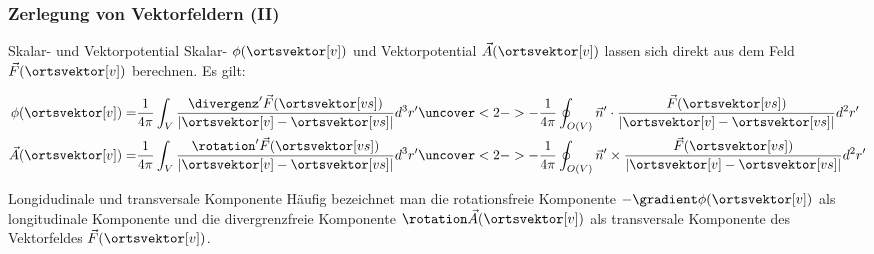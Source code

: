 \begin{frame}
  \frametitle{Zerlegung von Vektorfeldern (II)}
  \begin{block}{Skalar- und Vektorpotential}
    \alert{Skalar-} $\phi (\ortsvektor[v])$ und \alert{Vektorpotential}
    $\vec{A}(\ortsvektor[v])$ lassen sich direkt aus dem Feld
    $\vec{F}(\ortsvektor[v])$ berechnen. Es gilt:

    \begin{align*}
  \phi (\ortsvektor[v]) = & \frac{1}{4\pi} \int_V \frac{\divergenz'
                     \vec{F}(\ortsvektor[vs])}{\left|\ortsvektor[v]-\ortsvektor[vs]\right|}
                     d^3r'  \uncover<2->{- \frac{1}{4\pi} \oint_{O(V)}
                     \vec{n}' \cdot \frac{\vec{F}(\ortsvektor[vs])}{\left|\ortsvektor[v]-\ortsvektor[vs]\right|}
                     d^2r'}\\
  \vec{A} (\ortsvektor[v]) = & \frac{1}{4\pi} \int_V \frac{\rotation'
                     \vec{F}(\ortsvektor[vs])}{\left|\ortsvektor[v]-\ortsvektor[vs]\right|}
                     d^3r'  \uncover<2->{- \frac{1}{4\pi} \oint_{O(V)}
                     \vec{n}' \times \frac{\vec{F}(\ortsvektor[vs])}{\left|\ortsvektor[v]-\ortsvektor[vs]\right|}
                     d^2r'}
    \end{align*}\pause
  \end{block}\pause

  \begin{block}{Longidudinale und transversale Komponente}
    Häufig bezeichnet man die rotationsfreie Komponente $ - \gradient
    \phi (\ortsvektor[v])$ als \alert{longitudinale Komponente} und die
    divergrenzfreie Komponente $\rotation
    \vec{A}(\ortsvektor[v])$ als \alert{transversale Komponente} des
    Vektorfeldes $\vec{F}(\ortsvektor[v])$.
    \end{block}
  \end{frame}


